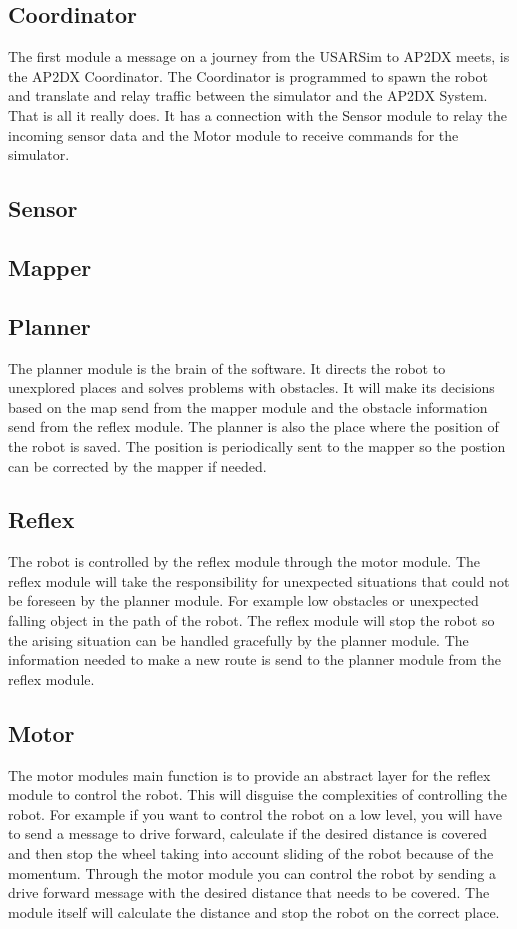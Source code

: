 \documentclass[titlepage, a4paper,10pt]{article}
\begin{document}
\subsection{Coordinator}
The first module a message on a journey from the USARSim to AP2DX meets, is the AP2DX Coordinator. The Coordinator is programmed to spawn the robot and translate and relay traffic between the simulator and the AP2DX System. That is all it really does. It has a connection with the Sensor module to relay the incoming sensor data and the Motor module to receive commands for the simulator.

\subsection{Sensor}


\subsection{Mapper}


\subsection{Planner}
The planner module is the brain of the software. It directs the robot to unexplored places and solves problems with obstacles. It will make its decisions based on the map send from the mapper module and the obstacle information send from the reflex module. The planner is also the place where the position of the robot is saved. The position is periodically sent to the mapper so the postion can be corrected by the mapper if needed.

\subsection{Reflex}
The robot is controlled by the reflex module through the motor module. The reflex module will take the responsibility for unexpected situations that could not be foreseen by the planner module. For example low obstacles or unexpected falling object in the path of the robot. The reflex module will stop the robot so the arising situation can be handled gracefully by the planner module. The information needed to make a new route is send to the planner module from the reflex module.

\subsection{Motor}
The motor modules main function is to provide an abstract layer for the reflex module to control the robot. This will disguise the complexities of controlling the robot. For example if you want to control the robot on a low level, you will have to send a message to drive forward, calculate if the desired distance is covered and then stop the wheel taking into account sliding of the robot because of the momentum. Through the motor module you can control the robot by sending a drive forward message with the desired distance that needs to be covered. The module itself will calculate the distance and stop the robot on the correct place.
\end{document}

